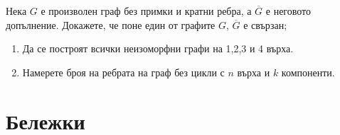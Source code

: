 \begin{problem}
  Нека $G$ е произволен граф без примки и кратни ребра, а $\overline{G}$ е неговото допълнение.
  Докажете, че поне един от графите $G$, $\overline{G}$ е свързан;
\end{problem}


\begin{problem}
  \begin{enumerate}
  \item
    Да се построят всички неизоморфни графи на 1,2,3 и 4 върха.
  \item
    Намерете броя на ребрата на граф без цикли с $n$ върха и $k$ компоненти.
  \end{enumerate}
\end{problem}


\section*{Бележки}

